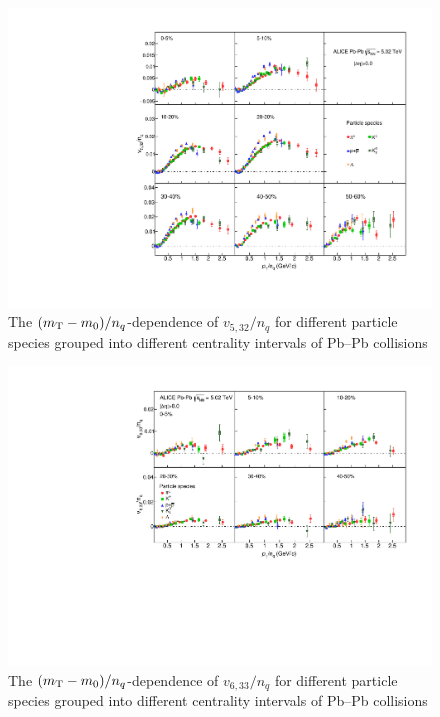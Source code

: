 \documentclass[ALICE,manyauthors]{cernphprep}
\providecommand{\DIFaddbeginFL}{} %
\providecommand{\DIFaddendFL}{} %
\providecommand{\DIFdelbeginFL}{} %
\providecommand{\DIFdelendFL}{} %
\begin{document}
\begin{figure}[htb]
\begin{center}
\DIFdelbeginFL %
\DIFdelendFL %
\DIFaddbeginFL \includegraphics[scale=0.82]{figures/scaling/All_v523_gap00_KET_3by3.pdf}

\DIFaddendFL \end{center}
\caption{The $(m_{\rm{T}} - m_{0})/n_{q}$-dependence of $v_{5,32}/n_{q}$ for different particle species grouped into different centrality intervals of Pb--Pb collisions \sNN}
\label{v523_KET}
\end{figure}

\begin{figure}[htb]
\begin{center}
\DIFdelbeginFL %
\DIFdelendFL %
\DIFaddbeginFL \includegraphics[scale=0.82]{figures/scaling/All_v633_gap00_KET_3by2.pdf}

\DIFaddendFL \end{center}
\caption{The $(m_{\rm{T}} - m_{0})/n_{q}$-dependence of $v_{6,33}/n_{q}$ for different particle species grouped into different centrality intervals of Pb--Pb collisions \sNN}
\label{v633_KET}
\end{figure}
\end{document}
